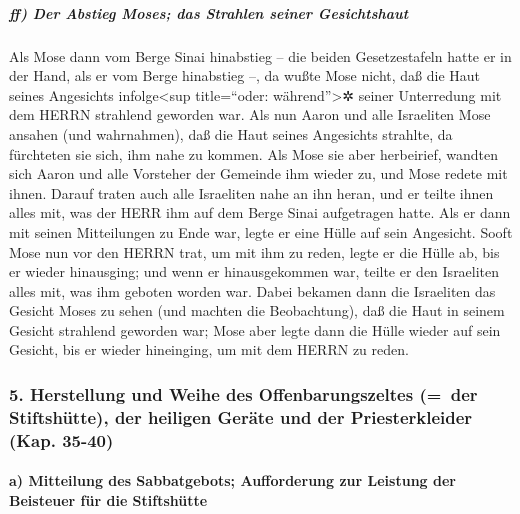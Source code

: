 \hypertarget{ff-der-abstieg-moses-das-strahlen-seiner-gesichtshaut}{%
\subparagraph{ff) Der Abstieg Moses; das Strahlen seiner
Gesichtshaut}\label{ff-der-abstieg-moses-das-strahlen-seiner-gesichtshaut}}

 Als Mose dann vom Berge Sinai hinabstieg -- die beiden
Gesetzestafeln hatte er in der Hand, als er vom Berge hinabstieg --, da
wußte Mose nicht, daß die Haut seines Angesichts infolge\textless sup
title=``oder: während''\textgreater✲ seiner Unterredung mit dem HERRN
strahlend geworden war.  Als nun Aaron und alle
Israeliten Mose ansahen (und wahrnahmen), daß die Haut seines Angesichts
strahlte, da fürchteten sie sich, ihm nahe zu kommen. 
Als Mose sie aber herbeirief, wandten sich Aaron und alle Vorsteher der
Gemeinde ihm wieder zu, und Mose redete mit ihnen. 
Darauf traten auch alle Israeliten nahe an ihn heran, und er teilte
ihnen alles mit, was der HERR ihm auf dem Berge Sinai aufgetragen hatte.
 Als er dann mit seinen Mitteilungen zu Ende war, legte
er eine Hülle auf sein Angesicht.  Sooft Mose nun vor den
HERRN trat, um mit ihm zu reden, legte er die Hülle ab, bis er wieder
hinausging; und wenn er hinausgekommen war, teilte er den Israeliten
alles mit, was ihm geboten worden war.  Dabei bekamen
dann die Israeliten das Gesicht Moses zu sehen (und machten die
Beobachtung), daß die Haut in seinem Gesicht strahlend geworden war;
Mose aber legte dann die Hülle wieder auf sein Gesicht, bis er wieder
hineinging, um mit dem HERRN zu reden.

\hypertarget{herstellung-und-weihe-des-offenbarungszeltes-der-stiftshuxfctte-der-heiligen-geruxe4te-und-der-priesterkleider-kap.-35-40}{%
\subsubsection{5. Herstellung und Weihe des Offenbarungszeltes (=~der
Stiftshütte), der heiligen Geräte und der Priesterkleider (Kap.
35-40)}\label{herstellung-und-weihe-des-offenbarungszeltes-der-stiftshuxfctte-der-heiligen-geruxe4te-und-der-priesterkleider-kap.-35-40}}

\hypertarget{a-mitteilung-des-sabbatgebots-aufforderung-zur-leistung-der-beisteuer-fuxfcr-die-stiftshuxfctte}{%
\paragraph{a) Mitteilung des Sabbatgebots; Aufforderung zur Leistung der
Beisteuer für die
Stiftshütte}\label{a-mitteilung-des-sabbatgebots-aufforderung-zur-leistung-der-beisteuer-fuxfcr-die-stiftshuxfctte}}

